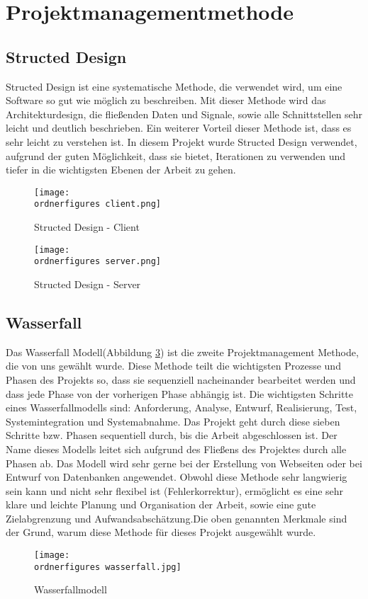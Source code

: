 \section{Projektmanagementmethode}

\subsection{Structed Design}
Structed Design ist eine systematische Methode, die verwendet wird, um eine Software so gut wie m\"{o}glich zu beschreiben. Mit dieser Methode wird das Architekturdesign, die flie\ss{}enden Daten und Signale, sowie alle Schnittstellen sehr leicht und deutlich beschrieben. Ein weiterer Vorteil dieser Methode ist, dass es sehr leicht zu verstehen ist. In diesem Projekt wurde Structed Design verwendet, aufgrund der guten M\"{o}glichkeit, dass sie bietet, Iterationen zu verwenden und tiefer in die wichtigsten Ebenen der Arbeit zu gehen. 



\begin{figure}[h]
	\centering
	\texttt{[image: \\ordnerfigures
		client.png]}
	\caption{Structed Design - Client}
	\label{fi:sd-client}
\end{figure}



\begin{figure}[h]
	
	\centering
	\texttt{[image: \\ordnerfigures
		server.png]}
	\caption{Structed Design - Server}
	\label{fi:sd-server}
\end{figure}


\subsection{Wasserfall}
Das Wasserfall Modell(Abbildung \ref{fi:wasserfall}) ist die zweite Projektmanagement Methode, die von uns gew\"{a}hlt wurde. Diese Methode teilt die wichtigsten Prozesse und Phasen des Projekts so, dass sie sequenziell nacheinander bearbeitet werden und dass jede Phase von der vorherigen Phase abh\"{a}ngig ist. Die wichtigsten Schritte eines Wasserfallmodells sind: Anforderung, Analyse, Entwurf, Realisierung, Test, Systemintegration und Systemabnahme. Das Projekt geht durch diese sieben Schritte bzw. Phasen sequentiell durch, bis die Arbeit abgeschlossen ist. Der Name dieses Modells leitet sich aufgrund des Flie\ss{}ens des Projektes durch alle Phasen ab.  Das Modell wird sehr gerne bei der Erstellung von Webseiten oder bei Entwurf von Datenbanken angewendet. Obwohl diese Methode sehr langwierig sein kann und nicht sehr flexibel ist (Fehlerkorrektur), erm\"{o}glicht es eine sehr klare und leichte Planung und Organisation der Arbeit, sowie eine gute Zielabgrenzung und Aufwandsabsch\"{a}tzung.Die oben genannten Merkmale sind der Grund, warum diese Methode f\"{u}r dieses Projekt ausgew\"{a}hlt wurde. 



\begin{figure}[h]
	\centering
	\texttt{[image: \\ordnerfigures
		wasserfall.jpg]}
	\caption{Wasserfallmodell}
	\label{fi:wasserfall}
\end{figure}



